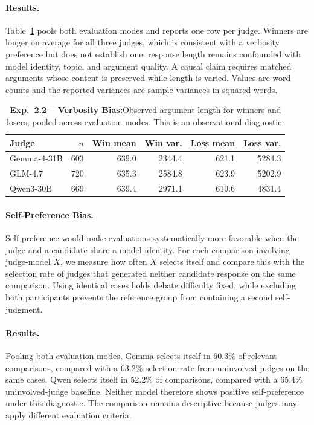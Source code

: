 \documentclass{article}
\begin{document}
\paragraph{Results.}
Table~\ref{tab:current-verbosity} pools both evaluation modes and reports one row per judge. Winners are longer on average for all three judges, which is consistent with a verbosity preference but does not establish one: response length remains confounded with model identity, topic, and argument quality. A causal claim requires matched arguments whose content is preserved while length is varied. Values are word counts and the reported variances are sample variances in squared words.

\begin{table}[t]
  \centering
  \footnotesize
  \setlength{\tabcolsep}{4pt}
  \caption{\textbf{Exp.~2.2 -- Verbosity Bias:}\enspace Observed argument length for winners and losers, pooled across evaluation modes. This is an observational diagnostic.}
  \label{tab:current-verbosity}
  \begin{tabularx}{\textwidth}{@{}>{\raggedright\arraybackslash}Xrrrrr@{}}
    \toprule
    Judge & $n$ & Win mean & Win var. & Loss mean & Loss var. \\
    \midrule
    Gemma-4-31B & 603 & 639.0 & 2344.4 & 621.1 & 5284.3 \\
    GLM-4.7 & 720 & 635.3 & 2584.8 & 623.9 & 5202.9 \\
    Qwen3-30B & 669 & 639.4 & 2971.1 & 619.6 & 4831.4 \\
    \bottomrule
  \end{tabularx}
\end{table}

\paragraph{Self-Preference Bias.}
Self-preference would make evaluations systematically more favorable when the judge and a candidate share a model identity. For each comparison involving judge-model $X$, we measure how often $X$ selects itself and compare this with the selection rate of judges that generated neither candidate response on the same comparison. Using identical cases holds debate difficulty fixed, while excluding both participants prevents the reference group from containing a second self-judgment.

\paragraph{Results.}
Pooling both evaluation modes, Gemma selects itself in 60.3\% of relevant comparisons, compared with a 63.2\% selection rate from uninvolved judges on the same cases. Qwen selects itself in 52.2\% of comparisons, compared with a 65.4\% uninvolved-judge baseline. Neither model therefore shows positive self-preference under this diagnostic. The comparison remains descriptive because judges may apply different evaluation criteria.
\end{document}
